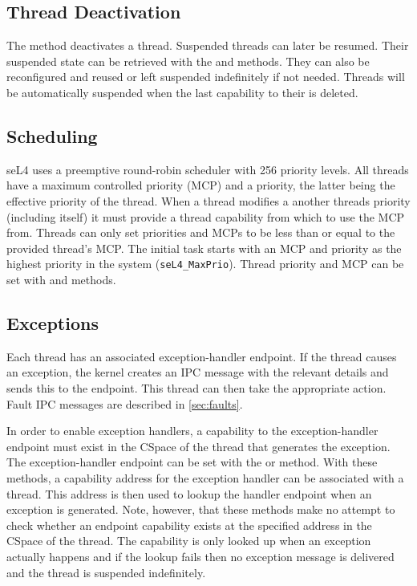 \subsection{Thread Deactivation}
\label{sec:thread_deactivation}

The  method deactivates a thread.
Suspended threads can later be resumed.
Their suspended state can be retrieved with the
 and
 methods.
They can also be reconfigured and
reused or left suspended indefinitely if not needed. Threads will be
automatically suspended when the last capability to their  is
deleted.

\subsection{Scheduling}
\label{sec:sched}

seL4 uses a preemptive round-robin scheduler with 256 priority levels.
All threads have a maximum controlled priority (MCP) and a priority, the latter being the effective
priority of the thread.
When a thread modifies a another threads priority (including itself) it must provide a
thread capability from which to use the MCP from. Threads can only set priorities and MCPs
to be less than or equal to the provided thread's MCP.
The initial task starts with an MCP and priority as the highest priority in the system (\texttt{seL4\_MaxPrio}).
Thread priority and MCP can be set with 
and  methods.

\subsection{Exceptions}

Each thread has an associated exception-handler endpoint. If the thread
causes an exception, the kernel creates an IPC message with the relevant
details and sends this to the endpoint. This
thread can then take the appropriate action. Fault IPC messages are
described in \autoref{sec:faults}.

In order to enable exception handlers, a capability to the exception-handler
endpoint must exist in the CSpace of the thread that generates the exception.
The exception-handler
endpoint can be set with the  or
 method.
With these methods, a capability address for the exception handler can be associated with a thread.
This address is then used to lookup the handler endpoint when an exception is generated.
Note, however, that these methods make no attempt to check whether an endpoint capability exists at the specified
address in the CSpace of the thread. The capability is only looked up
when an exception actually happens and if the lookup fails then no
exception message is delivered and the thread is suspended indefinitely.

